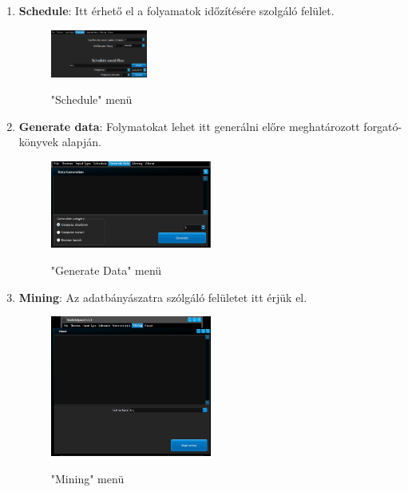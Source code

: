 \begin{enumerate}
{\begin{itemize}
		\end{itemize}
	}
	\item{
		\textbf{Schedule}: Itt érhető el a folyamatok időzítésére szolgáló felület.
		\begin{figure}[h!]
			\begin{center}
				\caption{"Schedule" menü}
				\includegraphics[width=0.3\textwidth, keepaspectratio=true]{images/img_ui_schedule}\\
				\label{fig:example}
			\end{center}
		\end{figure}
	}
	\item{
		\textbf{Generate data}: Folymatokat lehet itt generálni előre meghatározott forgató\hyp{}könyvek alapján.
		\begin{figure}[h!]
			\begin{center}
				\caption{"Generate Data" menü}
				\includegraphics[width=0.5\textwidth, keepaspectratio=true]{images/img_ui_datagen}\\
				\label{fig:example}
			\end{center}
		\end{figure}
	}
	\item{
		\textbf{Mining}: Az adatbányászatra szólgáló felületet itt érjük el.
		\begin{figure}[h!]
			\begin{center}
				\caption{"Mining" menü}
				\includegraphics[width=0.5\textwidth, keepaspectratio=true]{images/img_ui_mining}\\

\end{center}
\end{figure}}
\end{enumerate}
